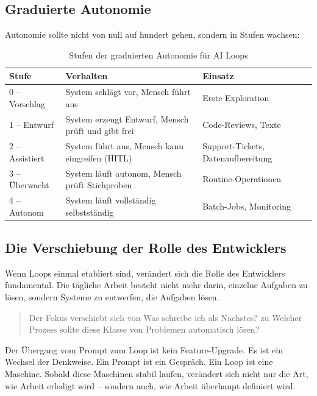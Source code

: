 \subsection{Graduierte Autonomie}

Autonomie sollte nicht von null auf hundert gehen, sondern in Stufen wachsen:

\begin{table}[H]
\centering
\begin{tabularx}{\linewidth}{lXl}
\toprule
\textbf{Stufe} & \textbf{Verhalten} & \textbf{Einsatz} \\
\midrule
0 -- Vorschlag & System schlägt vor, Mensch führt aus & Erste Exploration \\
1 -- Entwurf & System erzeugt Entwurf, Mensch prüft und gibt frei & Code-Reviews, Texte \\
2 -- Assistiert & System führt aus, Mensch kann eingreifen (HITL) & Support-Tickets, Datenaufbereitung \\
3 -- Überwacht & System läuft autonom, Mensch prüft Stichproben & Routine-Operationen \\
4 -- Autonom & System läuft vollständig selbstständig & Batch-Jobs, Monitoring \\
\bottomrule
\end{tabularx}
\caption{Stufen der graduierten Autonomie für AI Loops}
\label{tab:autonomie-stufen}
\end{table}

\subsection{Die Verschiebung der Rolle des Entwicklers}

Wenn Loops einmal etabliert sind, verändert sich die Rolle des Entwicklers fundamental. Die tägliche Arbeit besteht nicht mehr darin, einzelne Aufgaben zu lösen, sondern Systeme zu entwerfen, die Aufgaben lösen.

\begin{quote}
Der Fokus verschiebt sich von \glqq Was schreibe ich als Nächstes?\grqq{} zu \glqq Welcher Prozess sollte diese Klasse von Problemen automatisch lösen?\grqq{}
\end{quote}

Der Übergang vom Prompt zum Loop ist kein Feature-Upgrade. Es ist ein Wechsel der Denkweise. Ein Prompt ist ein Gespräch. Ein Loop ist eine Maschine. Sobald diese Maschinen stabil laufen, verändert sich nicht nur die Art, wie Arbeit erledigt wird -- sondern auch, wie Arbeit überhaupt definiert wird.

